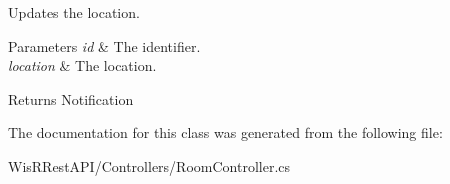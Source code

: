 Updates the location. 


\begin{DoxyParams}{Parameters}
{\em id} & The identifier.\\
\hline
{\em location} & The location.\\
\hline
\end{DoxyParams}
\begin{DoxyReturn}{Returns}
Notification
\end{DoxyReturn}


The documentation for this class was generated from the following file\+:\begin{DoxyCompactItemize}
\item 
Wis\+R\+Rest\+A\+P\+I/\+Controllers/Room\+Controller.\+cs\end{DoxyCompactItemize}

